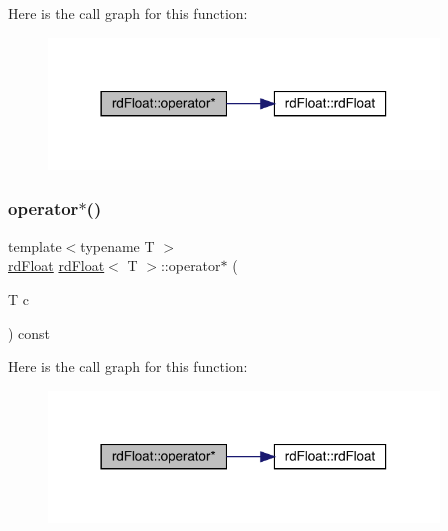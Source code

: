 Here is the call graph for this function\+:\nopagebreak
\begin{figure}[H]
\begin{center}
\leavevmode
\includegraphics[width=294pt]{structrd_float_a95b7a406601f9f1e146a52acf7f862ae_cgraph}
\end{center}
\end{figure}
\mbox{\label{structrd_float_a954150029323e6e561c63ba9ed6c7cb4}} 
\subsubsection{\texorpdfstring{operator$\ast$()}{operator*()}\hspace{0.1cm}{\footnotesize\ttfamily [2/2]}}
{\footnotesize\ttfamily template$<$typename T $>$ \\
\mbox{\hyperlink{structrd_float}{rd\+Float}} \mbox{\hyperlink{structrd_float}{rd\+Float}}$<$ T $>$\+::operator$\ast$ (\begin{DoxyParamCaption}\item[{T}]{c }\end{DoxyParamCaption}) const\hspace{0.3cm}{\ttfamily [inline]}}

Here is the call graph for this function\+:\nopagebreak
\begin{figure}[H]
\begin{center}
\leavevmode
\includegraphics[width=294pt]{structrd_float_a954150029323e6e561c63ba9ed6c7cb4_cgraph}
\end{center}
\end{figure}
\mbox{\label{structrd_float_a6157eded7f08502ffe4149f95f490eab}} 
